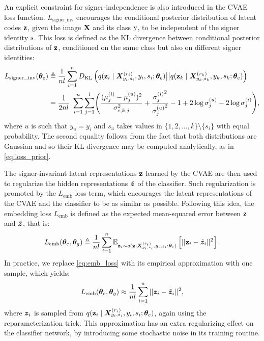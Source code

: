 An explicit constraint for signer-independence is also introduced in the CVAE loss function. $L_{\text{signer\_inv}}$ encourages the conditional posterior distribution of latent codes ${\mathbf{z}}$, given the image ${\mathbf{X}}$ and its class ${\textnormal{y}}$, to be independent of the signer identity ${\textnormal{s}}$. This loss is defined as the KL divergence between conditional posterior distributions of ${\mathbf{z}}$, conditioned on the same class but also on different signer identities:
\begin{align}
    \label{eq:loss_signer_inv}
    L_{\text{signer\_inv}}({\bm{\theta}}_{e}) &\triangleq \frac{1}{nl} \sum_{i=1}^{n}D_{\mathrm{KL}}\left(q({\mathbf{z}}_{i} \mid {\bm{X}}^{(r_{i})}_{y_{i},s_{i}}, y_{i}, s_{i}; {\bm{\theta}}_e) \big| \big| q({\mathbf{z}}_{k} \mid {\bm{X}}^{(r_{k})}_{y_{k},s_{k}}, y_{k}, s_{k}; {\bm{\theta}}_e)\right) \nonumber\\
    &=\frac{1}{2nl}~\sum_{i=1}^{n}\sum_{j=1}^{l} \Biggl(\frac{(\mu^{(i)}_j - \mu^{(u)}_j)^2}{\sigma_{e,k,j}^2} + \frac{{\sigma^{(i)}_j}^2}{{\sigma^{(u)}_j}^2} -1 + 2\log {\sigma^{(u)}_j} - 2\log {\sigma^{(i)}_j} \Biggr),
\end{align}
where $u$ is such that $y_{u}=y_{i}$ and $s_u$ takes values in $\{1,2,\dots,k\} \setminus \lbrace s_i \rbrace$ with equal probability. The second equality follows from the fact that both distributions are Gaussian and so their KL divergence may be computed analytically, as in \eqref{eq:loss_prior}.

The signer-invariant latent representations ${\mathbf{z}}$ learned by the CVAE are then used to regularize the hidden representations $\tilde{{\bm{z}}}$ of the classifier. Such regularization is promoted by the $L_{\text{emb}}$ loss term, which encourages the latent representations of the CVAE and the classifier to be as similar as possible. Following this idea, the embedding loss $L_{\text{emb}}$ is defined as the expected mean-squared error between ${\mathbf{z}}$ and $\tilde{{\bm{z}}}$, that is:
\begin{equation}
    \label{eq:emb_loss}
    L_{\text{emb}}({\bm{\theta}}_e, {\bm{\theta}}_g) \triangleq \frac{1}{nl} \sum_{i=1}^{n} \mathbb{E}_{{\mathbf{z}}_{i} \sim q({\mathbf{z}} \mid {\bm{X}}^{(r_{i})}_{y_{i},s_{i}}, y_{i}, s_{i}; {\bm{\theta}}_e)} \left[ ||{\mathbf{z}}_i-\tilde{{\bm{z}}}_i||^2 \right].
\end{equation}
In practice, we replace \eqref{eq:emb_loss} with its empirical approximation with one sample, which yields:
\begin{equation}
    L_{\text{emb}}({\bm{\theta}}_e, {\bm{\theta}}_g) \approx \frac{1}{nl} \sum_{i=1}^{n}||{\bm{z}}_i-\tilde{{\bm{z}}}_i||^2,
\end{equation}
where ${\bm{z}}_i$ is sampled from $q({\mathbf{z}}_{i} \mid {\bm{X}}^{(r_{i})}_{y_{i},s_{i}}, y_{i}, s_{i}; {\bm{\theta}}_e)$, again using the reparameterization trick. This approximation has an extra regularizing effect on the classifier network, by introducing some stochastic noise in its training routine.

